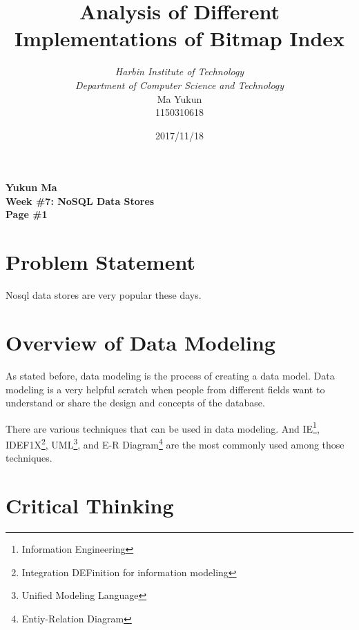 \documentclass[12pt, a4paper]{article}
\begin{document}
\title{{\bf\Huge Analysis of Different Implementations of Bitmap Index}}
\author{\emph{Harbin Institute of Technology}\\\emph{Department of Computer Science and Technology}\\Ma Yukun\\1150310618}

\date{2017/11/18}

\nocite{*}


\begin{center}
{\textbf{
Yukun Ma\\
Week \#7: NoSQL Data Stores\\
Page \#1}}
\end{center}

\section{Problem Statement}

Nosql data stores are very popular these days.




\section{Overview of Data Modeling}

As stated before, data modeling is the process of creating a data model. Data modeling is a very helpful scratch when people from different fields want to understand or share the design and concepts of the database.

There are various techniques that can be used in data modeling. And IE\footnote{Information Engineering}, IDEF1X\footnote{Integration DEFinition for information modeling}, UML\footnote{Unified Modeling Language}, and E-R Diagram\footnote{Entiy-Relation Diagram} are the most commonly used among those techniques.


\section{Critical Thinking}
\end{document}
